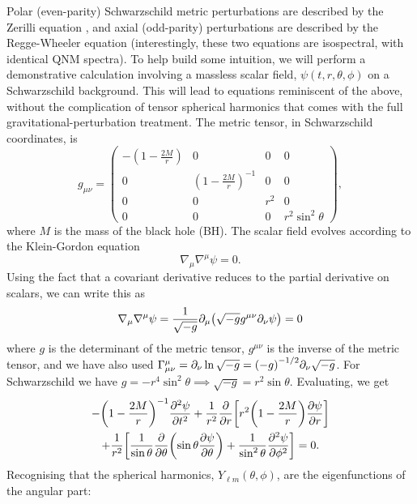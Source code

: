 Polar (even-parity) Schwarzschild metric perturbations are described by the Zerilli equation \cite{Zerilli:1970se, Zerilli:1970wzz}, and axial (odd-parity) perturbations are described by the Regge-Wheeler equation \cite{Regge:1957td} (interestingly, these two equations are isospectral, with identical QNM spectra).
To help build some intuition, we will perform a demonstrative calculation involving a massless scalar field, $\psi(t,r,\theta,\phi)$ on a Schwarzschild background.
This will lead to equations reminiscent of the above, without the complication of tensor spherical harmonics that comes with the full gravitational-perturbation treatment.
The metric tensor, in Schwarzschild coordinates, is
\begin{equation}
g_{\mu\nu} = \begin{pmatrix}
- \left(1 - \frac{2M}{r}\right) & 0 & 0 & 0 \\
0 & \left(1 - \frac{2M}{r}\right)^{-1} & 0 & 0 \\
0 & 0 & r^2 & 0 \\
0 & 0 & 0 & r^2 \sin^2\theta
\end{pmatrix},
\end{equation}
where $M$ is the mass of the black hole (BH). 
The scalar field evolves according to the Klein-Gordon equation 
\begin{equation}
    \nabla_\mu \nabla^\mu \psi = 0.
\end{equation}
Using the fact that a covariant derivative reduces to the partial derivative on scalars, we can write this as
\begin{equation}
    \nabla_\mu \nabla^\mu \psi = \frac{1}{\sqrt{-g}} \partial_\mu \qty(\sqrt{-g} g^{\mu\nu} \partial_\nu \psi) = 0
\end{equation}
where $g$ is the determinant of the metric tensor, $g^{\mu\nu}$ is the inverse of the metric tensor, and we have also used $\Gamma^\mu_{\mu\nu} = \partial_\nu \ln{\sqrt{-g}} = \qty(-g)^{-1/2} \partial_\nu \sqrt{-g}$.
For Schwarzschild we have $g = -r^4 \sin^2{\theta} \implies \sqrt{-g} = r^2 \sin{\theta}$.
Evaluating, we get
\begin{multline}
    - \qty(1 - \frac{2M}{r})^{-1} \pdv[2]{\psi}{t} + \frac{1}{r^2} \pdv{r} \qty[r^2 \qty(1 - \frac{2M}{r}) \pdv{\psi}{r} ]\\
    + \frac{1}{r^2} \qty[ \frac{1}{\sin{\theta}} \pdv{\theta} \qty(\sin{\theta} \pdv{\psi}{\theta} ) + \frac{1}{\sin^2{\theta}} \pdv[2]{\psi}{\phi} ] = 0.
\end{multline}
Recognising that the spherical harmonics, $Y_{\ell m}(\theta,\phi)$, are the eigenfunctions of the angular part:
